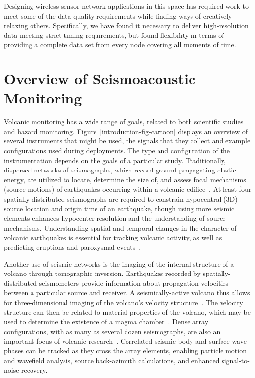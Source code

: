 Designing wireless sensor network applications in this space has required
work to meet some of the data quality requirements while finding ways of
creatively relaxing others.  Specifically, we have found it necessary to
deliver high-resolution data meeting strict timing requirements, but found
flexibility in terms of providing a complete data set from every node
covering all moments of time.

\section{Overview of Seismoacoustic Monitoring}

Volcanic monitoring has a wide range of goals, related to both scientific
studies and hazard monitoring. Figure~\ref{introduction-fig-cartoon} displays
an overview of several instruments that might be used, the signals that they
collect and example configurations used during deployments. The type and
configuration of the instrumentation depends on the goals of a particular
study.  Traditionally, dispersed networks of seismographs, which record
ground-propagating elastic energy, are utilized to locate, determine the size
of, and assess focal mechanisms (source motions) of earthquakes occurring
within a volcanic edifice~\cite{Chouet03}.  At least four
spatially-distributed seismographs are required to constrain hypocentral (3D)
source location and origin time of an earthquake, though using more seismic
elements enhances hypocenter resolution and the understanding of source
mechanisms. Understanding spatial and temporal changes in the character of
volcanic earthquakes is essential for tracking volcanic activity, as well as
predicting eruptions and paroxysmal events~\cite{McNutt96}. 

Another use of seismic networks is the imaging of the internal structure of a
volcano through tomographic inversion.  Earthquakes recorded by
spatially-distributed seismometers provide information about propagation
velocities between a particular source and receiver.  A seismically-active
volcano thus allows for three-dimensional imaging of the volcano's velocity
structure~\cite{Benz96,Phillips91}. The velocity structure can then be
related to material properties of the volcano, which may be used to determine
the existence of a magma chamber~\cite{Lees89,Moran99}.  Dense array
configurations, with as many as several dozen seismographs, are also an
important focus of volcanic research~\cite{Dietel89,Neuberg94}. Correlated
seismic body and surface wave phases can be tracked as they cross the array
elements, enabling particle motion and wavefield analysis, source
back-azimuth calculations, and enhanced signal-to-noise recovery.

